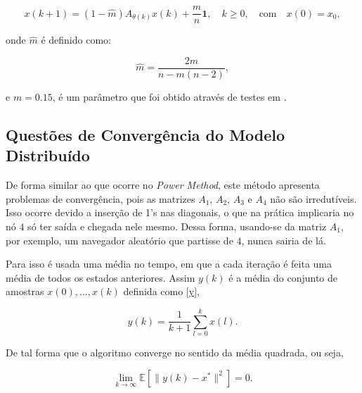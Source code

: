 \begin{equation} \label{Ax}
x(k+1) = (1 - \hat{m})A_{\theta(k)}x(k) + \frac{\hat{m}}{n} \textbf{1}, \quad k \geq 0, \quad \text{com} \quad x(0) = x_0,
\end{equation}

\noindent onde $\hat{m}$ é definido como: 

\begin{equation}\label{m}
\hat{m} = \frac{2m}{n-m(n-2)},
\end{equation}

\noindent e $m = 0.15$, é um parâmetro que foi obtido através de testes em \cite{zaki2012detection}.    

\subsection{Questões de Convergência do Modelo Distribuído}%

De forma similar ao que ocorre no \textit{Power Method}, este método apresenta problemas de convergência, pois as matrizes $A_1$, $A_2$, $A_3$ e $A_4$ não são irredutíveis. Isso ocorre devido a inserção de 1's nas diagonais, o que na prática implicaria no nó $4$ só ter saída e chegada nele mesmo. Dessa forma, usando-se da matriz $A_1$, por exemplo, um navegador aleatório que partisse de $4$, nunca sairia de lá.

Para isso é usada uma média no tempo, em que a cada iteração é feita uma média de todos os estados anteriores. Assim $y(k)$ é a média do conjunto de amostras $x(0),... , x(k)$ definida como \eqref{y}, 

\begin{equation}\label{y}
y(k) = \frac{1}{k+1} \sum_{l=0}^{k} x(l).
\end{equation}


\noindent De tal forma que o algoritmo converge no sentido da média quadrada, ou seja,

\begin{equation}\label{E}
\lim_{k\rightarrow \infty} \mathbb{E} [\parallel y(k)-x^*\parallel^2] = 0.
\end{equation}

